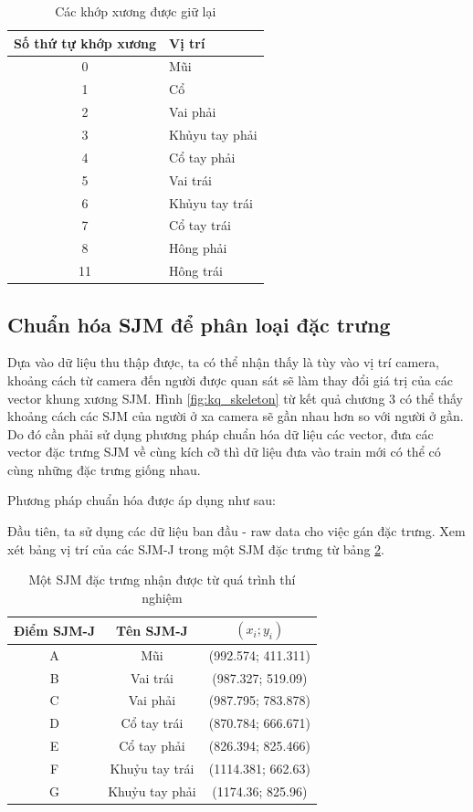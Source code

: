 \FloatBarrier
\begin{table}[h]
\caption{Các khớp xương được giữ lại}
\label{table:joints_choose}
\centering
\begin{center}
\begin{tabular}{|c|p{9cm}|} 
 \hline
Số thứ tự khớp xương  & Vị trí \\
 \hline
 0 & Mũi\\
 \hline 
 1 & Cổ\\
 \hline 
 2 & Vai phải\\
 \hline
 3 & Khủyu tay phải \\
 \hline 
 4 & Cổ tay phải\\
 \hline
 5 & Vai trái\\
 \hline
 6 & Khủyu tay trái\\
 \hline
 7 & Cổ tay trái\\
 \hline
 8 & Hông phải\\
 \hline
 11 & Hông trái\\
 \hline
\end{tabular}
\end{center}
\end{table}
\FloatBarrier

\subsection{Chuẩn hóa SJM để phân loại đặc trưng}

Dựa vào dữ liệu thu thập được, ta có thể nhận thấy là tùy vào vị trí camera, khoảng cách từ camera đến người được quan sát sẽ làm thay đổi giá trị của các vector khung xương SJM. Hình \ref{fig:kq_skeleton} từ kết quả chương 3 có thể thấy khoảng cách các SJM của người ở xa camera sẽ gần nhau hơn so với người ở gần. Do đó cần phải sử dụng phương pháp chuẩn hóa dữ liệu các vector, đưa các vector đặc trưng SJM về cùng kích cỡ thì dữ liệu đưa vào train mới có thể có cùng những đặc trưng giống nhau.

Phương pháp chuẩn hóa được áp dụng như sau:


Đầu tiên, ta sử dụng các dữ liệu ban đầu - raw data cho việc gán đặc trưng. Xem xét bảng vị trí của các SJM-J trong một SJM đặc trưng từ bảng \ref{BangSJM}.

\begin{table}[htbp]
\centering
\caption{Một SJM đặc trưng nhận được từ quá trình thí nghiệm}
\begin{tabular}{|c|c|c|}
\hline 
 Điểm SJM-J & Tên SJM-J & $(x_i; y_i) $\\ 
\hline 
A & Mũi  & (992.574; 411.311) \\
\hline 
B & Vai trái & (987.327; 519.09) \\ 
\hline 
C & Vai phải  & (987.795; 783.878) \\ 
\hline 
D & Cổ tay trái & (870.784; 666.671) \\ 
\hline 
E & Cổ tay phải & (826.394; 825.466) \\ 
\hline
F & Khuỷu tay trái & (1114.381; 662.63) \\ 
\hline
G & Khuỷu tay phải & (1174.36; 825.96) \\ 
\hline 
\end{tabular} 
\label{BangSJM}
\end{table}

